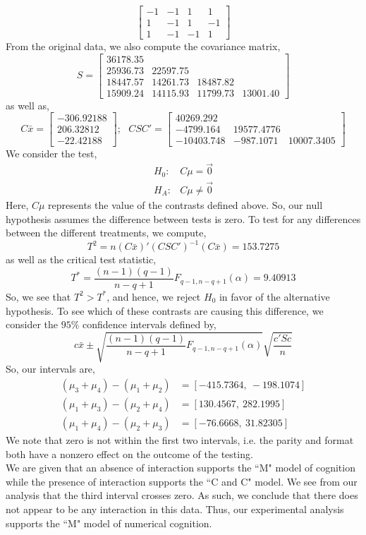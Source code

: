 \documentclass[letterpaper,10pt]{article}
\begin{document}
\begin{enumerate}
\[\begin{bmatrix}
-1 & -1 & 1 & 1\\1 & -1 & 1 & -1\\ 1 & -1 & -1 & 1
\end{bmatrix} \]
From the original data, we also compute the covariance matrix,
\[S=\begin{bmatrix}
36178.35 \\
25936.73 & 22597.75 \\
18447.57 & 14261.73 & 18487.82 \\
15909.24 & 14115.93 & 11799.73 & 13001.40
\end{bmatrix} \]
as well as,
\[C\bar{x}=\begin{bmatrix}
-306.92188\\ 206.32812\\ -22.42188
\end{bmatrix};\ \ \ CSC'=\begin{bmatrix}
40269.292\\
-4799.164 & 19577.4776\\
-10403.748 & -987.1071 & 10007.3405
\end{bmatrix} \]
We consider the test,
\begin{align*}
H_0: & C\mu = \vec{0}\\
H_A: & C\mu \neq \vec{0}
\end{align*}
Here, $C\mu$ represents the value of the contrasts defined above. So, our null hypothesis assumes the difference between tests is zero.  To test for any differences between the different treatments, we compute,
\[T^2=n(C\bar{x})'(CSC')^{-1}(C\bar{x})=153.7275\]
as well as the critical test statistic,
\[T^*=\frac{(n-1)(q-1)}{n-q+1}F_{q-1,n-q+1}(\alpha)=9.40913\]
So, we see that $T^2>T^*$, and hence, we reject $H_0$ in favor of the alternative hypothesis. To see which of these contrasts are causing this difference, we consider the $95\%$ confidence intervals defined by,
\[c\bar{x} \pm \sqrt{\frac{(n-1)(q-1)}{n-q+1}F_{q-1,n-q+1}(\alpha)}\sqrt{\frac{c'Sc}{n}}\]
So, our intervals are,
\begin{align*}
(\mu_3+\mu_4)-(\mu_1+\mu_2) &= [-415.7364,\ -198.1074]\\
(\mu_1+\mu_3)-(\mu_2+\mu_4) &= [130.4567,\ 282.1995]\\
(\mu_1+\mu_4)-(\mu_2+\mu_3) &= [-76.6668,\ 31.82305]
\end{align*}
We note that zero is not within the first two intervals, i.e. the parity and format both have a nonzero effect on the outcome of the testing.\\
We are given that an absence of interaction supports the ``M" model of cognition while the presence of interaction supports the ``C and C" model. We see from our analysis that the third interval crosses zero. As such, we conclude that there does not appear to be any interaction in this data. Thus, our experimental analysis supports the ``M" model of numerical cognition.

\end{enumerate}
\end{document}
